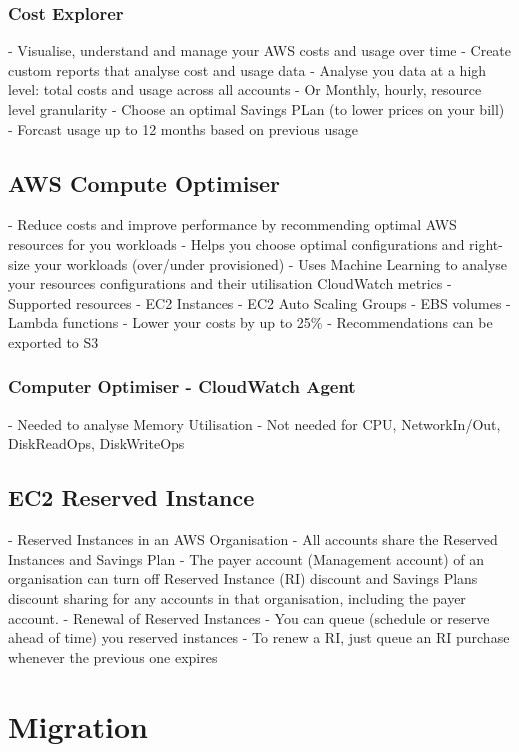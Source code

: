 \documentclass[11pt]{book}
\begin{document}
    \subsection{Cost Explorer}
    - Visualise, understand and manage your AWS costs and usage over time
    - Create custom reports that analyse cost and usage data
    - Analyse you data at a high level: total costs and usage across all accounts
    - Or Monthly, hourly, resource level granularity
    - Choose an optimal Savings PLan (to lower prices on your bill)
    - Forcast usage up to 12 months based on previous usage



    \section{AWS Compute Optimiser}
    - Reduce costs and improve performance by recommending optimal AWS resources for you workloads
    - Helps you choose optimal configurations and right-size your workloads (over/under provisioned)
    - Uses Machine Learning to analyse your resources configurations and their utilisation CloudWatch metrics
    - Supported resources
    - EC2 Instances
    - EC2 Auto Scaling Groups
    - EBS volumes
    - Lambda functions
    - Lower your costs by up to 25\%
    - Recommendations can be exported to S3

    \subsection{Computer Optimiser - CloudWatch Agent}
    - Needed to analyse Memory Utilisation
    - Not needed for CPU, NetworkIn/Out, DiskReadOps, DiskWriteOps


    \section{EC2 Reserved Instance}
    - Reserved Instances in an AWS Organisation
    - All accounts share the Reserved Instances and Savings Plan
    - The payer account (Management account) of an organisation can turn off Reserved Instance (RI) discount and Savings Plans discount sharing for any accounts in that organisation, including the payer account.
    - Renewal of Reserved Instances
    - You can queue (schedule or reserve ahead of time) you reserved instances
    - To renew a RI, just queue an RI purchase whenever the previous one expires


    \chapter{Migration}
\end{document}
